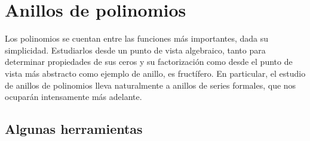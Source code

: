 %

\chapter{Anillos de polinomios}
\label{cha:anillos-polinomios}

  Los polinomios se cuentan entre las funciones más importantes,
  dada su simplicidad.
  Estudiarlos desde un punto de vista algebraico,
  tanto para determinar propiedades de sus ceros
  y su factorización
  como desde el punto de vista más abstracto como ejemplo de anillo,
  es fructífero.
  En particular,
  el estudio de anillos de polinomios lleva naturalmente
  a anillos de series formales,
  que nos ocuparán intensamente más adelante.

\section{Algunas herramientas}
\label{sec:algunas-herramientas-poly}


